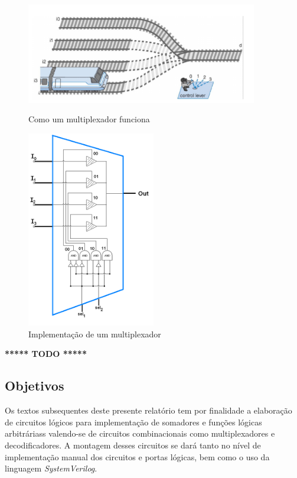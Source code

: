 \documentclass[12pt]{article}
\begin{document}
\begin{figure}[H]
    \centering
    \begin{minipage}{0.45\textwidth}
      \centering
      \includegraphics[width=0.9\textwidth]{Exp06/mux.png}
      \caption{Como um multiplexador funciona}\label{fig:mux.png}
    \end{minipage}\hfill
    \begin{minipage}{0.45\textwidth}
      \centering
      \includegraphics[width=0.5\textwidth]{Exp06/mux_wiki.png}
      \caption{Implementação de um multiplexador}\label{fig:mux_wiki.png}
    \end{minipage}\hfill
\end{figure}

\textbf{***** TODO *****}

\subsection{Objetivos}
\label{sec:Objetivos}

Os textos subsequentes deste presente relatório tem por finalidade a elaboração
de circuitos lógicos para implementação de somadores e funções lógicas
arbitráriass valendo-se de circuitos combinacionais como multiplexadores e
decodificadores. A montagem desses circuitos se dará tanto no nível de
implementação manual dos circuitos e portas lógicas, bem como o uso da linguagem
\emph{SystemVerilog}.
\end{document}
